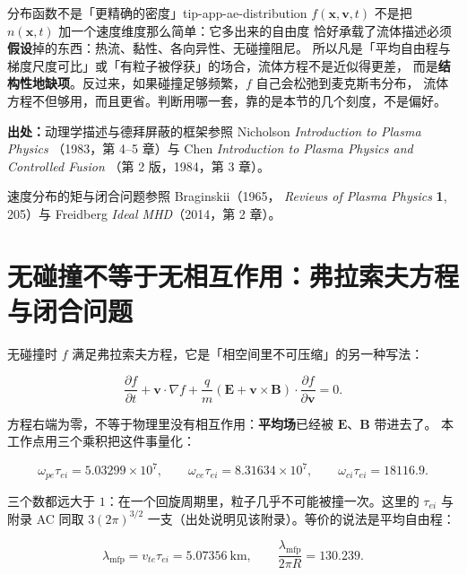 \begin{tip}{分布函数不是「更精确的密度」}{tip-app-ae-distribution}
$f(\mathbf{x},\mathbf{v},t)$ 不是把 $n(\mathbf{x},t)$ 加一个速度维度那么简单：它多出来的自由度
恰好承载了流体描述必须\textbf{假设}掉的东西：热流、黏性、各向异性、无碰撞阻尼。
所以凡是「平均自由程与梯度尺度可比」或「有粒子被俘获」的场合，流体方程不是近似得更差，
而是\textbf{结构性地缺项}。反过来，如果碰撞足够频繁，$f$ 自己会松弛到麦克斯韦分布，
流体方程不但够用，而且更省。判断用哪一套，靠的是本节的几个刻度，不是偏好。
\end{tip}

{\footnotesize
\textbf{出处：}动理学描述与德拜屏蔽的框架参照 Nicholson \emph{Introduction to Plasma Physics}
（1983，第 4--5 章）与 Chen \emph{Introduction to Plasma Physics and Controlled Fusion}
（第 2 版，1984，第 3 章）。

速度分布的矩与闭合问题参照 Braginskii（1965，
\emph{Reviews of Plasma Physics} \textbf{1}, 205）与 Freidberg \emph{Ideal MHD}（2014，第 2 章）。
}

\section{无碰撞不等于无相互作用：弗拉索夫方程与闭合问题}
\label{sec:app-ae-vlasov}

无碰撞时 $f$ 满足弗拉索夫方程，它是「相空间里不可压缩」的另一种写法：

\begin{equation}
\frac{\partial f}{\partial t}+\mathbf{v}\cdot\nabla f+
\frac{q}{m}\left(\mathbf{E}+\mathbf{v}\times\mathbf{B}\right)\cdot\frac{\partial f}{\partial\mathbf{v}}=0 .
\label{eq:app-ae-vlasov}
\end{equation}

方程右端为零，不等于物理里没有相互作用：\textbf{平均场}已经被 $\mathbf{E}$、$\mathbf{B}$ 带进去了。
本工作点用三个乘积把这件事量化：

\begin{equation}
\omega_{pe}\tau_{ei}=5.03299\times10^{7},\qquad
\omega_{ce}\tau_{ei}=8.31634\times10^{7},\qquad
\omega_{ci}\tau_{ei}=18116.9 .
\label{eq:app-ae-collisionality}
\end{equation}

三个数都远大于 $1$：在一个回旋周期里，粒子几乎不可能被撞一次。这里的 $\tau_{ei}$ 与附录 AC 同取 $3(2\pi)^{3/2}$ 一支（出处说明见该附录）。等价的说法是平均自由程：

\begin{equation}
\lambda_{\mathrm{mfp}}=v_{te}\tau_{ei}=5.07356\ \mathrm{km},\qquad
\frac{\lambda_{\mathrm{mfp}}}{2\pi R}=130.239 .
\label{eq:app-ae-mfp}
\end{equation}

